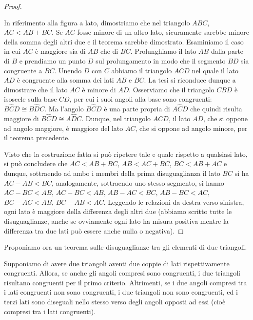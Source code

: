   \begin{proof}
~

\noindent\begin{minipage}{0.7\textwidth}\parindent15pt 
    In riferimento alla figura a lato, dimostriamo che nel triangolo 
    \(ABC\), \(AC < AB + BC\). Se \(AC\) fosse minore di un altro lato, 
    sicuramente sarebbe minore della somma degli altri due e il teorema 
    sarebbe dimostrato. Esaminiamo il caso in cui \(AC\) è maggiore sia di 
    \(AB\) che di \(BC\). Prolunghiamo il lato \(AB\) dalla parte di \(B\) e 
    prendiamo un punto \(D\) sul prolungamento in modo che il segmento \(BD\) 
    sia congruente a \(BC\). Unendo \(D\) con \(C\) abbiamo il triangolo \(ACD\) 
    nel quale il lato \(AD\) è congruente alla somma dei lati \(AB\) e \(BC\). 
    La tesi si riconduce dunque a dimostrare che il lato \(AC\) è minore di 
    \(AD\). Osserviamo che il triangolo \(CBD\) è isoscele sulla base \(CD\), 
    per cui i suoi angoli alla base sono congruenti: \(B\widehat{C}D\cong 
    B\widehat{D}C\). Ma l'angolo \(B\widehat{C}D\) è una parte propria di 
    \(A\widehat{C}D\) che quindi risulta maggiore di \(B\widehat{C}D\cong 
    A\widehat{D}C\). Dunque, nel triangolo \(ACD\), il lato \(AD\), che si 
    oppone ad angolo maggiore, è maggiore del lato \(AC\), che si oppone ad 
    angolo minore, per il teorema precedente.
\end{minipage}\hfil
\begin{minipage}{0.3\textwidth}
  \centering
\end{minipage}
    
    Visto che la costruzione fatta si può ripetere tale e quale rispetto 
    a qualsiasi lato, si può concludere che \(AC<AB+BC\), \(AB<AC+BC\), 
    \(BC<AB+AC\) e dunque, sottraendo ad ambo i membri della prima 
    disuguaglianza il lato \(BC\) si ha \(AC-AB<BC\), analogamente, 
    sottraendo uno stesso segmento, si hanno \(AC-BC<AB\), \(AC-BC<AB\), 
    \(AB-AC<BC\), \(AB-BC<AC\), \(BC-AC<AB\), \(BC-AB<AC\). Leggendo le relazioni 
    da destra verso sinistra, ogni lato è maggiore della differenza degli 
    altri due (abbiamo scritto tutte le disuguaglianze, anche se 
    ovviamente ogni lato ha misura positiva mentre la differenza tra due 
    lati può essere anche nulla o negativa).
  \end{proof}

Proponiamo ora un teorema sulle disuguaglianze tra gli elementi di 
due triangoli.

Supponiamo di avere due triangoli aventi due coppie di lati 
rispettivamente congruenti. Allora, se anche gli angoli compresi sono 
congruenti, i due triangoli risultano congruenti per il primo 
criterio. Altrimenti, se i due angoli compresi tra i lati congruenti 
non sono congruenti, i due triangoli non sono congruenti, ed i terzi 
lati sono diseguali nello stesso verso degli angoli opposti ad essi 
(cioè compresi tra i lati congruenti).

